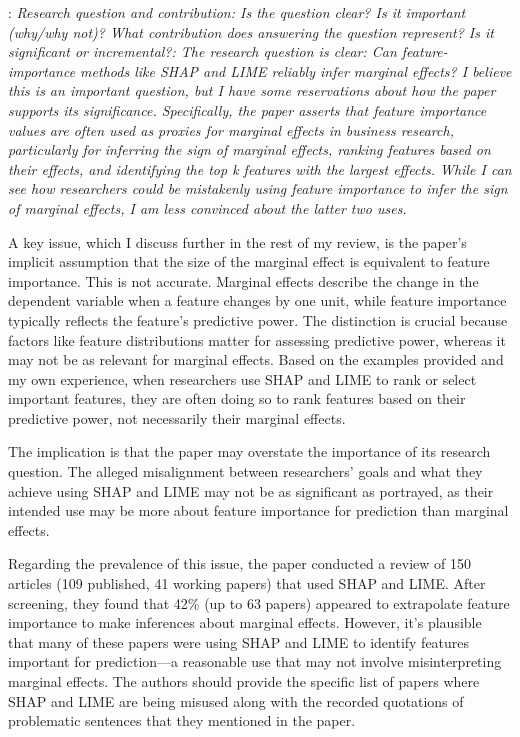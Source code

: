 \documentclass[11pt]{article}
\newcounter{se}[section]
\newcounter{reviewer}
\newcounter{point}[reviewer]
\renewcommand{\thepoint}{R\,\thereviewer.\arabic{point}}
\newenvironment{point}{
    \refstepcounter{point} \bigskip \noindent {\textbf{\thepoint}}: \rmfamily \itshape
}{\medskip}
\begin{document}
\begin{point}\label{r1:research_question}
Research question and contribution: Is the question clear? Is it important (why/why not)? What contribution does answering the question represent? Is it significant or incremental?: The research question is clear: Can feature-importance methods like SHAP and LIME reliably infer marginal effects? I believe this is an important question, but I have some reservations about how the paper supports its significance. Specifically, the paper asserts that feature importance values are often used as proxies for marginal effects in business research, particularly for inferring the sign of marginal effects, ranking features based on their effects, and identifying the top k features with the largest effects. While I can see how researchers could be mistakenly using feature importance to infer the sign of marginal effects, I am less convinced about the latter two uses.

A key issue, which I discuss further in the rest of my review, is the paper’s implicit assumption that the size of the marginal effect is equivalent to feature importance. This is not accurate. Marginal effects describe the change in the dependent variable when a feature changes by one unit, while feature importance typically reflects the feature's predictive power. The distinction is crucial because factors like feature distributions matter for assessing predictive power, whereas it may not be as relevant for marginal effects. Based on the examples provided and my own experience, when researchers use SHAP and LIME to rank or select important features, they are often doing so to rank features based on their predictive power, not necessarily their marginal effects.

The implication is that the paper may overstate the importance of its research question. The alleged misalignment between researchers’ goals and what they achieve using SHAP and LIME may not be as significant as portrayed, as their intended use may be more about feature importance for prediction than marginal effects.

Regarding the prevalence of this issue, the paper conducted a review of 150 articles (109 published, 41 working papers) that used SHAP and LIME. After screening, they found that 42\% (up to 63 papers) appeared to extrapolate feature importance to make inferences about marginal effects. However, it’s plausible that many of these papers were using SHAP and LIME to identify features important for prediction—a reasonable use that may not involve misinterpreting marginal effects. The authors should provide the specific list of papers where SHAP and LIME are being misused along with the recorded quotations of problematic sentences that they mentioned in the paper. 


\end{point}
\end{document}
